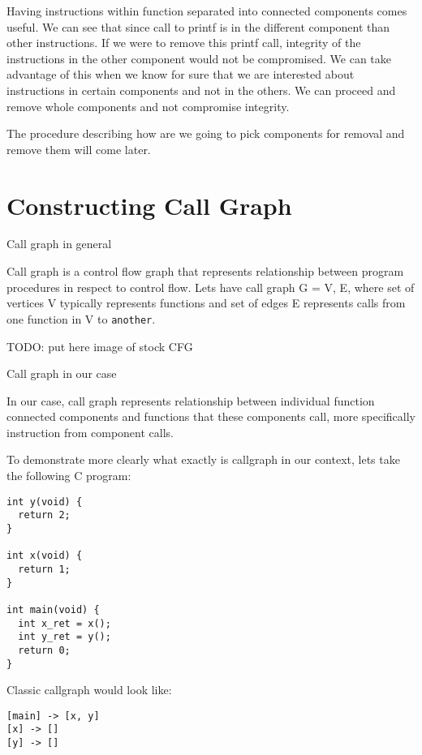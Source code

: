 \documentclass[12pt, twoside]{fithesis2}
\renewcommand{\_}{\leavevmode \kern0.07em\vbox{\hrule width0.4em}}
\begin{document}
Having instructions within function separated into connected components comes
useful. We can see that since call to printf is in the different component than
other instructions. If we were to remove this printf call, integrity of the
instructions in the other component would not be compromised. We can take
advantage of this when we know for sure that we are interested about
instructions in certain components and not in the others. We can proceed and
remove whole components and not compromise integrity.

The procedure describing how are we going to pick components for removal and
remove them will come later.

\section{Constructing Call Graph}
\label{sec:design-callgraph}


Call graph in general

Call graph is a control flow graph that represents relationship between program
procedures in respect to control flow. Lets have call graph G = {V, E}, where
set of vertices V typically represents functions and set of edges E represents
calls from one function in V to \texttt{another}.

TODO: put here image of stock CFG


Call graph in our case

In our case, call graph represents relationship between individual function
connected components and functions that these components call, more
specifically instruction from component calls.

To demonstrate more clearly what exactly is callgraph in our context, lets take
the following C program:

\begin{verbatim}
int y(void) {
  return 2;
}

int x(void) {
  return 1;
}

int main(void) {
  int x_ret = x();
  int y_ret = y();
  return 0;
}
\end{verbatim}

Classic callgraph would look like:

\begin{verbatim}
[main] -> [x, y]
[x] -> []
[y] -> []
\end{verbatim}
\end{document}
